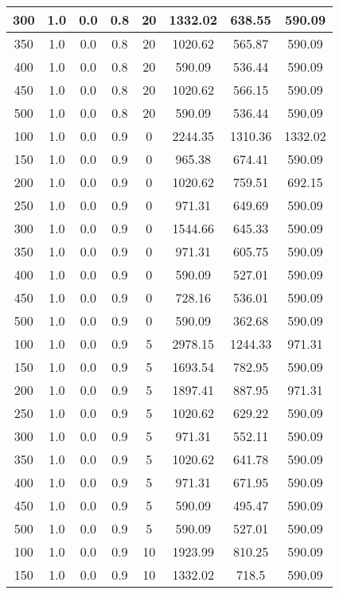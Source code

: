 \documentclass[a4paper, 12pt]{extreport}
\begin{document}
\begin{itemize}
\begin{longtable}{|c|c|c|c|c|c|c|c|}
			300 & 1.0 & 0.0 & 0.8 & 20 & 1332.02 & 638.55 & 590.09 \\\hline
			350 & 1.0 & 0.0 & 0.8 & 20 & 1020.62 & 565.87 & 590.09 \\\hline
			400 & 1.0 & 0.0 & 0.8 & 20 & 590.09 & 536.44 & 590.09 \\\hline
			450 & 1.0 & 0.0 & 0.8 & 20 & 1020.62 & 566.15 & 590.09 \\\hline
			500 & 1.0 & 0.0 & 0.8 & 20 & 590.09 & 536.44 & 590.09 \\\hline
			100 & 1.0 & 0.0 & 0.9 & 0 & 2244.35 & 1310.36 & 1332.02 \\\hline
			150 & 1.0 & 0.0 & 0.9 & 0 & 965.38 & 674.41 & 590.09 \\\hline
			200 & 1.0 & 0.0 & 0.9 & 0 & 1020.62 & 759.51 & 692.15 \\\hline
			250 & 1.0 & 0.0 & 0.9 & 0 & 971.31 & 649.69 & 590.09 \\\hline
			300 & 1.0 & 0.0 & 0.9 & 0 & 1544.66 & 645.33 & 590.09 \\\hline
			350 & 1.0 & 0.0 & 0.9 & 0 & 971.31 & 605.75 & 590.09 \\\hline
			400 & 1.0 & 0.0 & 0.9 & 0 & 590.09 & 527.01 & 590.09 \\\hline
			450 & 1.0 & 0.0 & 0.9 & 0 & 728.16 & 536.01 & 590.09 \\\hline
			500 & 1.0 & 0.0 & 0.9 & 0 & 590.09 & 362.68 & 590.09 \\\hline
			100 & 1.0 & 0.0 & 0.9 & 5 & 2978.15 & 1244.33 & 971.31 \\\hline
			150 & 1.0 & 0.0 & 0.9 & 5 & 1693.54 & 782.95 & 590.09 \\\hline
			200 & 1.0 & 0.0 & 0.9 & 5 & 1897.41 & 887.95 & 971.31 \\\hline
			250 & 1.0 & 0.0 & 0.9 & 5 & 1020.62 & 629.22 & 590.09 \\\hline
			300 & 1.0 & 0.0 & 0.9 & 5 & 971.31 & 552.11 & 590.09 \\\hline
			350 & 1.0 & 0.0 & 0.9 & 5 & 1020.62 & 641.78 & 590.09 \\\hline
			400 & 1.0 & 0.0 & 0.9 & 5 & 971.31 & 671.95 & 590.09 \\\hline
			450 & 1.0 & 0.0 & 0.9 & 5 & 590.09 & 495.47 & 590.09 \\\hline
			500 & 1.0 & 0.0 & 0.9 & 5 & 590.09 & 527.01 & 590.09 \\\hline
			100 & 1.0 & 0.0 & 0.9 & 10 & 1923.99 & 810.25 & 590.09 \\\hline
			150 & 1.0 & 0.0 & 0.9 & 10 & 1332.02 & 718.5 & 590.09 \\\hline

\end{longtable}
\end{itemize}
\end{document}
